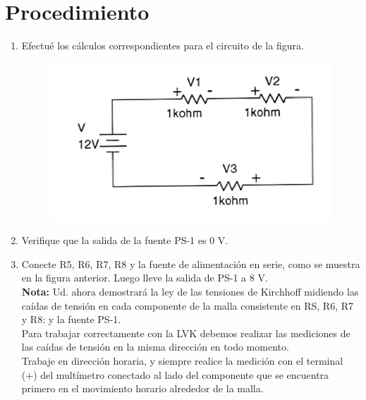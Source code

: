 \section{Procedimiento}
\begin{enumerate}
	\item Efectué los cálculos correspondientes para el circuito de la figura.
	\begin{figure}[h]
		\centering
		\includegraphics[scale=0.2]{imagenes/2}
	\end{figure}
	\item Verifique que la salida de la fuente PS-1 es 0 V.
	\item Conecte R5, R6, R7, R8 y la fuente de alimentación en serie, como se muestra en	la figura anterior. Luego lleve la salida de PS-1 a 8 V.
	\\
	\textbf{Nota: } Ud. ahora demostrará la ley de las tensiones de Kirchhoff midiendo las
	caídas de tensión en cada componente de la malla consistente en RS, R6, R7 y
	R8: y la fuente PS-1.\\
	
	Para trabajar correctamente con la LVK debemos realizar las mediciones de las
	caídas de tensión en la misma dirección en todo momento.\\
	
	Trabaje en dirección horaria, y siempre realice la medición con el terminal (+) del
	multímetro conectado al lado del componente que se encuentra primero en el
	movimiento horario alrededor de la malla.
	 

\end{enumerate}
